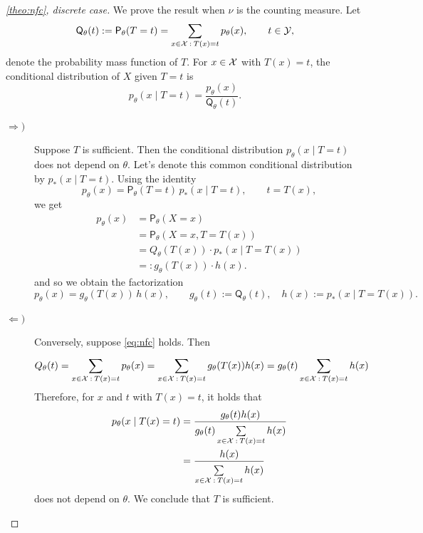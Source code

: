 \begin{proof}[\autoref{theo:nfc}, discrete case]
We prove the result when $\nu$ is the counting measure.
Let
\[
\mathsf{Q}_{\theta}(t) := \mathsf{P}_{\theta}(T=t)
= \sum_{x\in\mathcal{X}\: : \:T(x)=t} p_{\theta}(x),
\qquad t\in\mathcal{Y},
\]
denote the probability mass function of $T$.
For $x\in\mathcal{X}$ with $T(x)=t$, the conditional distribution of $X$ given $T=t$ is
\[
p_{\theta}(x\mid T=t)
= \frac{p_{\theta}(x)}{\mathsf{Q}_{\theta}(t)}.
\]

\begin{description}
  \item[\(\Longrightarrow)\)] 

Suppose $T$ is sufficient.
Then the conditional distribution $p_{\theta}(x\mid T=t)$ does not depend on $\theta$.
Let's denote this common conditional distribution by $p_{*}(x\mid T=t)$.
Using the identity
\[
p_{\theta}(x)
= \mathsf{P}_{\theta}(T=t)\, p_{*}(x\mid T=t),
\qquad t=T(x),
\]
we get
       \begin{align*}
           p_{\theta}(x)
           &= \mathsf{P}_{\theta}(X=x)
         \\&= \mathsf{P}_{\theta}(X=x,T=T(x))
         \\&
         = Q_{\theta}(T(x)) \cdot p_{*}(x\mid T=T(x)) 
         \\&=: g_{\theta}(T(x)) \cdot h(x).
       \end{align*}
and so we obtain the factorization
\[
p_{\theta}(x)
= g_{\theta}(T(x))\,h(x),
\qquad
g_{\theta}(t):=\mathsf{Q}_{\theta}(t),
\quad
h(x):=p_{*}(x\mid T=T(x)).
\]

  \item[\(\Longleftarrow)\)] 
Conversely, suppose \eqref{eq:nfc} holds.
Then
      \[
          Q_{\theta}(t) 
          = \sum\limits_{x\in \mathcal{X}\: :\: T(x)=t}^{} p_{\theta}(x) 
          = \sum\limits_{x\in \mathcal{X}\: :\: T(x)=t}^{} g_{\theta}(T(x)) h(x)
          = g_{\theta}(t)\sum\limits_{x\in \mathcal{X}\: :\: T(x)=t}^{} h(x)
      \]
     Therefore, for \(x\) and \(t\) with \(T(x)=t\), it holds that
     \begin{align*}
         p_{\theta}(x\mid T(x)=t)
         &= \frac{g_{\theta}(t)h(x)}{g_{\theta}(t)\sum\limits_{x \in \mathcal{X}\: : \: T(x)=t}^{} h(x) }
       \\&
       = \frac{h(x)}{\sum\limits_{x\in \mathcal{X}\: :\: T(x)=t}^{} h(x) }
     \end{align*}
     does not depend on \(\theta\). We conclude that \(T\) is sufficient.
\end{description}
\end{proof}


